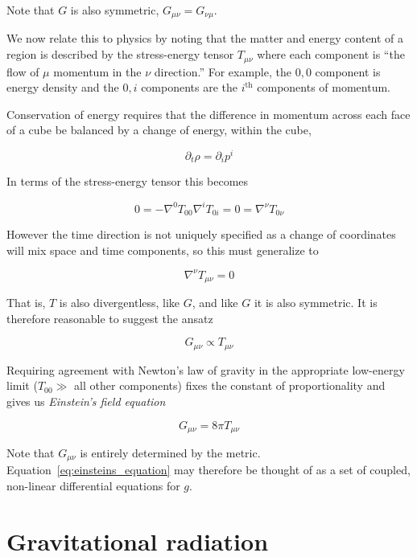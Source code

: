 Note that $G$ is also symmetric, $G_{\mu\nu} = G_{\nu\mu}$.

We now relate this to physics by noting that the matter and energy
content of a region is described by the stress-energy tensor
$T_{\mu\nu}$ where each component is ``the flow of $\mu$ momentum in the
$\nu$ direction.''  For example, the $0,0$ component is energy density
and the $0,i$ components are the $i^\mathrm{th}$ components of
momentum.

Conservation of energy requires that the difference in momentum
across each face of a cube be balanced by a change of energy,
within the cube,

\begin{equation*}
\partial_t \rho = \partial_i p^i
\end{equation*}

In terms of the stress-energy tensor this becomes

\begin{equation*}
0 = - \nabla^0 T_{00} \nabla^i T_{0i} = 0
= \nabla^\nu T_{0 \nu}
\end{equation*}

However the time direction is not uniquely specified as a change of
coordinates will mix space and time components, so this must
generalize to 

\begin{equation*}
\nabla^\nu T_{\mu\nu} = 0
\end{equation*}

That is, $T$ is also divergentless, like $G$, and like $G$ it is also
symmetric.  It is therefore reasonable to suggest the ansatz

\begin{equation*}
G_{\mu\nu} \propto T_{\mu\nu}
\end{equation*}

Requiring agreement with Newton's law of gravity in the appropriate
low-energy limit ($T_{00} \gg$ all other components) fixes the
constant of proportionality and gives us \emph{Einstein's field
equation}

\begin{equation}
\label{eq:einsteins_equation}
G_{\mu\nu} = 8\pi T_{\mu\nu}
\end{equation}


Note that $G_{\mu\nu}$ is entirely determined by the metric.
Equation~\ref{eq:einsteins_equation} may therefore be thought of as a
set of coupled, non-linear differential equations for $g$.

\section{Gravitational radiation}
\label{sec:gravitational_radiation}

